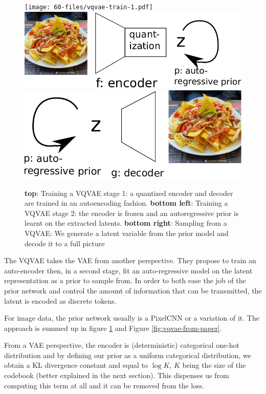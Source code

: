 \begin{figure}[ht]
    \centering
    \texttt{[image: 60-files/vqvae-train-1.pdf]}
    \includegraphics[scale=0.5]{60-files/vqvae-train-2.pdf} \hspace{1cm}
    \includegraphics[scale=0.5]{60-files/vqvae-sample.pdf}
    \caption{\textbf{top}: Training a \ac{VQVAE} stage 1: a quantized encoder and decoder are trained in an autoencoding fashion. \textbf{bottom left}: Training a \ac{VQVAE} stage 2: the encoder is frozen and an autoregressive prior is learnt on the extracted latents. \textbf{bottom right}: Sampling from a \ac{VQVAE}: We generate a latent variable from the prior model and decode it to a full picture}
    \label{fig:vqvae-train}
\end{figure}

The \ac{VQVAE} \citep{vqvae} takes the VAE from another perspective. They propose to train an auto-encoder then, in a second stage, fit an auto-regressive model on the latent representation as a prior to sample from. In order to both ease the job of the prior network and control the amount of information that can be transmitted, the latent is encoded as discrete tokens.

For image data, the prior network usually is a PixelCNN or a variation of it. The approach is summed up in figure \ref{fig:vqvae-train} and Figure \ref{fig:vqvae-from-paper}.

From a VAE perspective, the encoder is (deterministic) categorical one-hot distribution and by defining our prior as a uniform categorical distribution, we obtain a KL divergence constant and equal to $\log K$, $K$ being the size of the codebook (better explained in the next section). This dispenses us from computing this term at all and it can be removed from the loss.

